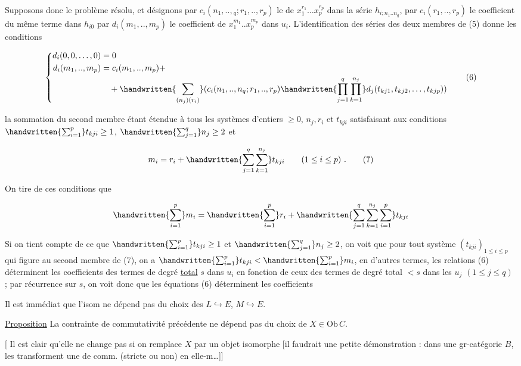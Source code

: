 Supposons donc le problème résolu, et désignons par $c_i(n_1,..,{}_{q};r_1,..,r_p)$ le  de $x_1^{r_1}\ldots x_p^{r_p}$ dans la série $h_{i;n_1..n_q}$, par $c_i(r_1,..,r_p)$ le coefficient du même terme dans $h_{i0}$ par $d_i(m_1,..,m_p)$ le coefficient de $x_1^{m_1}..x_p^{m_p}$ dans $u_i$. L'identification des séries des deux membres de (5) donne les conditions

\[
\left\{\begin{aligned}
d_i(0,0,\ldots,0)&=0\\
d_i(m_1,..,m_p)&=c_i(m_1,..,m_p)+\\
&\quad+\handwritten{\sum_{(n_j)(r_i)}}(c_i(n_1,..,n_q;r_1,..,r_p)
\handwritten{\prod_{j=1}^q\prod_{k=1}^{n_j}}d_j(t_{kj1},t_{kj2},\ldots,t_{kjp}))
\end{aligned}\right.\tag*{(6)}
\]

la sommation du second membre étant étendue à tous les systèmes d'entiers $\geq 0$, $n_j,r_i$ et $t_{kji}$ satisfaisant aux conditions $\handwritten{\sum_{i=1}^{p}}t_{kji}\geq 1$, $\handwritten{\sum_{j=1}^q}n_j\geq 2$ et

\[
m_i=r_i+\handwritten{\sum_{j=1}^{q}\sum_{k=1}^{n_j}}t_{kji}\qquad(1\leq i\leq p)\ .\tag*{(7)}
\]

On tire de ces conditions que

\[
\handwritten{\sum_{i=1}^{p}}m_i=\handwritten{\sum_{i=1}^{p}}r_i+
\handwritten{\sum_{j=1}^{q}\sum_{k=1}^{n_j}\sum_{i=1}^{p}}t_{kji}
\]

Si on tient compte de ce que $\handwritten{\sum_{i=1}^p}t_{kji}\geq 1$ et $\handwritten{\sum_{j=1}^{q}}n_j\geq 2$, on voit que pour tout système $(t_{kji})_{1\leq i\leq p}$ qui figure au second membre de (7), on a $\handwritten{\sum_{i=1}^p}t_{kji}<\handwritten{\sum_{i=1}^{p}}m_i$, en d'autres termes, les relations (6) déterminent les coefficients des termes de degré \uline{total} $s$ dans $u_i$ en fonction de ceux des termes de degré total $<s$ dans les $u_j$ $(1\leq j\leq q)$ ; par récurrence sur $s$, on voit donc que les équations (6) déterminent les coefficients

Il est immédiat que   l'isom ne dépend pas du choix des  $L\hookrightarrow E$, $M\hookrightarrow E$.

\uline{Proposition} La contrainte de commutativité précédente ne dépend pas du choix de $X\in\mathrm{Ob}\,C$.

[ Il est clair qu'elle ne change pas si on remplace $X$ par un objet isomorphe [il faudrait une petite démonstration : dans une gr-catégorie $B$, les    transforment une   de comm. (stricte ou non) en elle-m\ldots ]]

